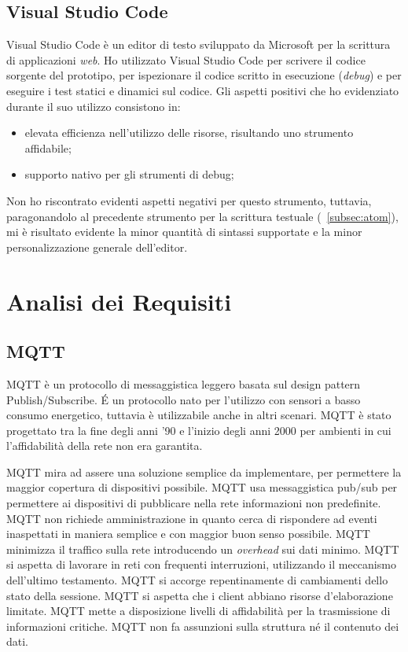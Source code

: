 \subsection{Visual Studio Code}

Visual Studio Code è un editor di testo sviluppato da Microsoft per la scrittura di applicazioni \emph{web}.
Ho utilizzato Visual Studio Code per scrivere il codice sorgente del prototipo, per ispezionare il codice scritto in esecuzione (\emph{debug}) e per eseguire i test statici e dinamici sul codice.
Gli aspetti positivi che ho evidenziato durante il suo utilizzo consistono in:
\begin{itemize}
	\item elevata efficienza nell'utilizzo delle risorse, risultando uno strumento affidabile;
	\item supporto nativo per gli strumenti di debug;
\end{itemize}
Non ho riscontrato evidenti aspetti negativi per questo strumento, tuttavia, paragonandolo al precedente strumento per la scrittura testuale (~\ref{subsec:atom}), mi è risultato evidente la minor quantità di sintassi supportate e la minor personalizzazione generale dell'editor.

\section{Analisi dei Requisiti}

\subsection{MQTT}
MQTT è un protocollo di messaggistica leggero basata sul design pattern Publish/Subscribe.
É un protocollo nato per l'utilizzo con sensori a basso consumo energetico, tuttavia è utilizzabile anche in altri scenari.
MQTT è stato progettato tra la fine degli anni '90 e l'inizio degli anni 2000 per ambienti in cui l'affidabilità della rete non era garantita.

MQTT mira ad assere una soluzione semplice da implementare, per permettere la maggior copertura di dispositivi possibile.
MQTT usa messaggistica pub/sub per permettere ai dispositivi di pubblicare nella rete informazioni non predefinite.
MQTT non richiede amministrazione in quanto cerca di rispondere ad eventi inaspettati in maniera semplice e con maggior buon senso possibile.
MQTT minimizza il traffico sulla rete introducendo un \emph{overhead} sui dati minimo.
MQTT si aspetta di lavorare in reti con frequenti interruzioni, utilizzando il meccanismo dell'ultimo testamento.
MQTT si accorge repentinamente di cambiamenti dello stato della sessione.
MQTT si aspetta che i client abbiano risorse d'elaborazione limitate.
MQTT mette a disposizione livelli di affidabilità per la trasmissione di informazioni critiche.
MQTT non fa assunzioni sulla struttura né il contenuto dei dati.

